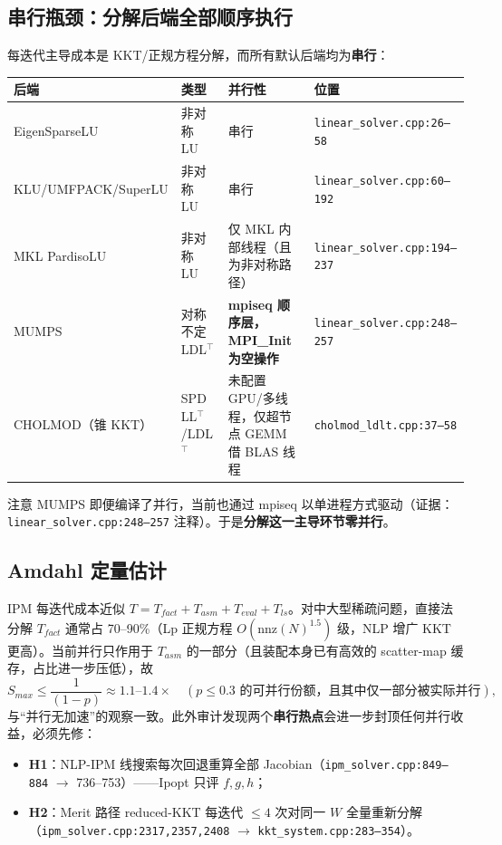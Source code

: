 \documentclass[11pt,a4paper]{ctexart}
\newcommand{\file}[1]{\texttt{#1}}
\newcommand{\evid}[1]{{\footnotesize\color{black!70}（证据：#1）}}
\begin{document}
\subsection{串行瓶颈：分解后端全部顺序执行}
每迭代主导成本是 KKT/正规方程分解，而所有默认后端均为\textbf{串行}：
\begin{center}\footnotesize
\begin{tabular}{@{}llll@{}}
\toprule
后端 & 类型 & 并行性 & 位置 \\
\midrule
EigenSparseLU & 非对称 LU & 串行 & \file{linear\_solver.cpp:26--58} \\
KLU/UMFPACK/SuperLU & 非对称 LU & 串行 & \file{linear\_solver.cpp:60--192} \\
MKL PardisoLU & 非对称 LU & 仅 MKL 内部线程（且为非对称路径） & \file{linear\_solver.cpp:194--237} \\
MUMPS & 对称不定 LDL$^{\top}$ & \textbf{mpiseq 顺序层，MPI\_Init 为空操作} & \file{linear\_solver.cpp:248--257} \\
CHOLMOD（锥 KKT） & SPD LL$^{\top}$/LDL$^{\top}$ & 未配置 GPU/多线程，仅超节点 GEMM 借 BLAS 线程 & \file{cholmod\_ldlt.cpp:37--58} \\
\bottomrule
\end{tabular}
\end{center}
注意 MUMPS 即便编译了并行，当前也通过 mpiseq 以单进程方式驱动\evid{\file{linear\_solver.cpp:248--257} 注释}。于是\textbf{分解这一主导环节零并行}。

\subsection{Amdahl 定量估计}
IPM 每迭代成本近似 $T = T_{fact} + T_{asm} + T_{eval} + T_{ls}$。对中大型稀疏问题，直接法分解 $T_{fact}$ 通常占 70--90\%（Lp 正规方程 $O(\mathrm{nnz}(N)^{1.5})$ 级，NLP 增广 KKT 更高）。当前并行只作用于 $T_{asm}$ 的一部分（且装配本身已有高效的 scatter-map 缓存，占比进一步压低），故
\begin{equation}
S_{max} \le \frac{1}{(1-p)} \approx 1.1\text{--}1.4\times \quad (p \le 0.3 \text{ 的可并行份额，且其中仅一部分被实际并行}),
\end{equation}
与``并行无加速''的观察一致。此外审计发现两个\textbf{串行热点}会进一步封顶任何并行收益，必须先修：
\begin{itemize}[leftmargin=2em]
  \item \textbf{H1}：NLP-IPM 线搜索每次回退重算全部 Jacobian（\file{ipm\_solver.cpp:849--884} $\to$ 736--753）——Ipopt 只评 $f,g,h$；
  \item \textbf{H2}：Merit 路径 reduced-KKT 每迭代 $\le 4$ 次对同一 $W$ 全量重新分解（\file{ipm\_solver.cpp:2317,2357,2408} $\to$ \file{kkt\_system.cpp:283--354}）。
\end{itemize}
\end{document}
